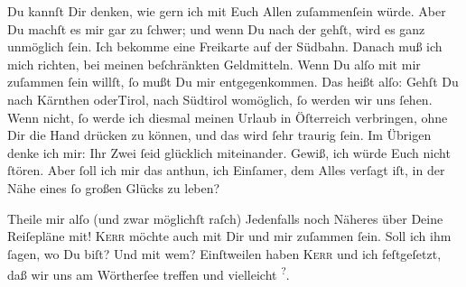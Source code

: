 \pstart
           Du kannſt Dir denken, wie gern ich mit Euch Allen zuſammenſein würde. Aber Du machſt
               es mir gar zu  ſchwer; und wenn Du nach der \label{K_L03071-1v}\label{K_L03071-1} gehſt, wird es
               ganz unmöglich ſein. Ich bekomme eine Freikarte auf der Südbahn. Danach muß ich mich richten, bei meinen beſchränkten
               Geldmitteln. Wenn Du alſo mit mir {\pb}zuſammen ſein
               willſt, ſo mußt Du mir entgegenkommen. Das heißt alſo: Gehſt Du nach \introOben{}Kärnthen oder\introOben{}{ }Tirol, nach Südtirol womöglich, ſo werden wir uns ſehen. Wenn  nicht, ſo werde ich diesmal meinen Urlaub in Öſterreich verbringen, ohne Dir die Hand drücken zu können, und das wird
               ſehr traurig ſein. Im Übrigen denke ich mir: Ihr Zwei ſeid glücklich miteinander.
               Gewiß, ich würde Euch nicht ſtören. Aber ſoll ich mir das anthun, ich Einſamer, {\pb}dem Alles verſagt iſt, in der Nähe eines ſo großen
               Glücks zu leben?\pend
           
\pstart
           Theile mir alſo \introOben{}(und zwar möglichſt raſch)\introOben{}{ } Jedenfalls noch Näheres über Deine Reiſepläne mit! \textsc{Kerr} möchte auch mit Dir und mir zuſammen ſein. Soll ich ihm ſagen, wo Du biſt? Und
               mit wem? Einſtweilen haben \textsc{Kerr} und ich feſtgeſetzt, daß wir uns am Wörtherſee treffen und vielleicht \label{K_L03071-2v}\label{K_L03071-2}\substVorne{}\textsuperscript{?}\substDazwischen{}.\substHinten{}\pend
           
